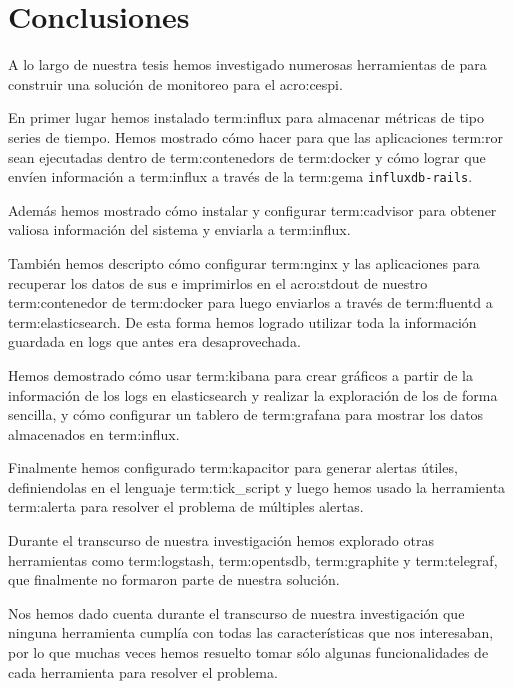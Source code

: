 \newpage
\section{Conclusiones}
\label{conclusiones}

A lo largo de nuestra tesis hemos investigado numerosas herramientas de
 para construir una solución de monitoreo para el
\gls{acro:cespi}.

En primer lugar hemos instalado \gls{term:influx} para almacenar métricas de
tipo series de tiempo. Hemos mostrado cómo hacer para que las aplicaciones
\gls{term:ror} sean ejecutadas dentro de \glspl{term:contenedor} de
\gls{term:docker} y cómo lograr que envíen información a \gls{term:influx} a
través de la \gls{term:gema} \texttt{influxdb-rails}.

Además hemos mostrado cómo instalar y configurar \gls{term:cadvisor} para
obtener valiosa información del sistema y enviarla a \gls{term:influx}.

También hemos descripto cómo configurar \gls{term:nginx} y las aplicaciones
para recuperar los datos de sus  e imprimirlos en el \gls{acro:stdout}
de nuestro \gls{term:contenedor} de \gls{term:docker} para luego enviarlos a
través de \gls{term:fluentd} a \gls{term:elasticsearch}. De esta forma hemos
logrado utilizar toda la información guardada en logs que antes era
desaprovechada.

Hemos demostrado cómo usar \gls{term:kibana} para crear gráficos a partir de la
información de los logs en elasticsearch y realizar la exploración de los
 de forma sencilla, y cómo configurar un tablero de \gls{term:grafana}
para mostrar los datos almacenados en \gls{term:influx}.

Finalmente hemos configurado \gls{term:kapacitor} para generar alertas útiles,
definiendolas en el lenguaje \gls{term:tick_script} y luego hemos usado la
herramienta \gls{term:alerta} para resolver el problema de múltiples alertas.

Durante el transcurso de nuestra investigación hemos explorado otras
herramientas como \gls{term:logstash}, \gls{term:opentsdb}, \gls{term:graphite}
y \gls{term:telegraf}, que finalmente no formaron parte de nuestra solución.

Nos hemos dado cuenta durante el transcurso de nuestra investigación que
ninguna herramienta cumplía con todas las características que nos interesaban,
por lo que muchas veces hemos resuelto tomar sólo algunas funcionalidades de
cada herramienta para resolver el problema.

